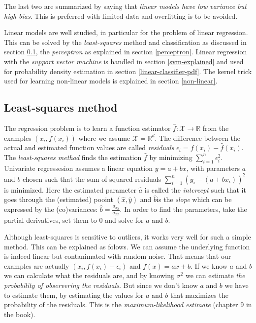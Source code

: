The last two are summarized by saying that \emph{linear models have low variance but high bias}.
This is preferred with limited data and overfitting is to be avoided.

Linear models are well studied, in particular for the problem of linear regression.
This can be solved by the \emph{least-squares} method and classification as discussed in section \ref{least-squares}, the \emph{perceptron} as explained in section \ref{perceptron}.
Linear regression with the \emph{support vector machine} is handled in section \ref{svm-explained} and used for probability density estimation in section \ref{linear-classifier-pdf}.
The kernel trick used for learning non-linear models is explained in section \ref{non-linear}.


\subsection{Least-squares method}\label{least-squares}
The regression problem is to learn a function estimator $\hat{f}:\mathcal{X} \to \mathbb{R}$ from the examples $(x_i, f(x_i))$ where we assume $\mathcal{X} = \mathbb{R}^d$.
The difference between the actual and estimated function values are called \emph{residuals} $\epsilon_i = f(x_i) - \hat{f}(x_i)$.
The \emph{least-squares method} finds the estimation $\hat{f}$ by minimizing $\sum_{i=1}^{n} \epsilon_i^2$.
Univariate regressesion assumes a linear equation $y = a + b x$, with parameters $a$ and $b$ chosen such that the sum of squared residuals $\sum_{i=1}^{n} (y_i - (a + b x_i))^2$ is minimized.
Here the estimated parameter $\hat{a}$ is called the \emph{intercept} such that it goes through the (estimated) pooint $(\hat{x},\hat{y})$ and $\hat{b}$is the \emph{slope} which can be expressed by the (co)variances: $\hat{b} = \frac{\sigma_{xy}}{\sigma_{xx}}$.
In order to find the parameters, take the partial derivatives, set them to $0$ and solve for $a$ and $b$.

Although least-squares is sensitive to outliers, it works very well for such a simple method.
This can be explained as folows.
We can assume the underlying function is indeed linear but contanimated with random noise.
That means that our examples are actually $(x_i, f(x_i) + \epsilon_i)$ and $f(x) = ax + b$.
If we know $a$ and $b$ we can calculate what the residuals are, and by knowing $\sigma^2$ we can estimate \emph{the probability of observering the residuals}.
But since we don't know $a$ and $b$ we have to estimate them, by estimating the values for $a$ and $b$ that maximizes the probability of the residuals.
This is the \emph{maximum-likelihood estimate} (chapter 9 in the book).

